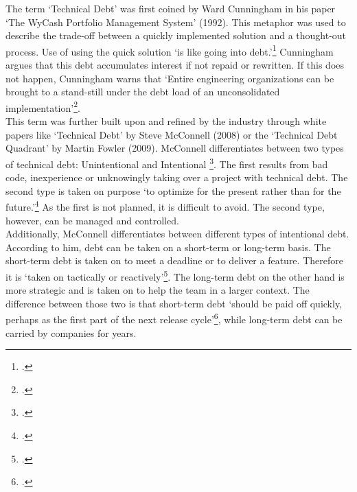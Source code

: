 The term `Technical Debt' was first coined by Ward Cunningham in his paper `The WyCash Portfolio Management System' (1992). This metaphor was used to describe the trade-off between a quickly implemented solution and a thought-out process. 
Use of using the quick solution `is like going into debt.'\footcite[2]{cunninghamWyCashPortfolioManagement1992} Cunningham argues that this debt accumulates interest if not repaid or rewritten. 
If this does not happen, Cunningham warns that `Entire engineering organizations can be brought to a stand-still under the debt load of an unconsolidated implementation'\footcite[2]{cunninghamWyCashPortfolioManagement1992}.\\

This term was further built upon and refined by the industry through white papers like `Technical Debt' by Steve McConnell (2008) or the `Technical Debt Quadrant' by Martin Fowler (2009).
McConnell differentiates between two types of technical debt: Unintentional and Intentional \footcite[3]{mcconnellManagingTechnicalDebt2017}. The first results from bad code, inexperience or unknowingly taking over a project with technical debt.
The second type is taken on purpose `to optimize for the present rather than for the future.'\footcite[3]{mcconnellManagingTechnicalDebt2017} As the first is not planned, it is difficult to avoid. The second type, however, can be managed and controlled.\\
Additionally, McConnell differentiates between different types of intentional debt. According to him, debt can be taken on a short-term or long-term basis. The short-term debt is taken on to meet a deadline or to deliver a feature. Therefore it is `taken on tactically or reactively'\footcite[3]{mcconnellManagingTechnicalDebt2017}.
The long-term debt on the other hand is more strategic and is taken on to help the team in a larger context. The difference between those two is that short-term debt `should be paid off quickly, perhaps as the first part of the next release cycle'\footcite[4]{mcconnellManagingTechnicalDebt2017}, while 
long-term debt can be carried by companies for years.\\

